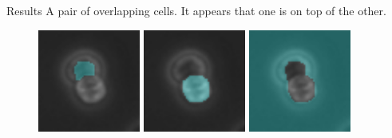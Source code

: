 \documentclass[8pt]{beamer}
\begin{document}
\begin{frame}{Results}
   A pair of overlapping cells.  It appears that one is on top of the other.\\

   \begin{figure}[ht]
      \centering
      \includegraphics[width=0.3\textwidth]{cells_overlap_seg_blend_0000.png} \hspace{0.45cm}
      \includegraphics[width=0.3\textwidth]{cells_overlap_seg_blend_0001.png} \hspace{0.45cm}
      \includegraphics[width=0.3\textwidth]{cells_overlap_seg_blend_0002.png}
   \end{figure}
\end{frame}
\end{document}
